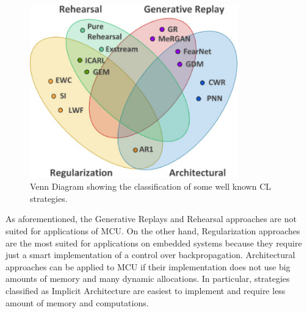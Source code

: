 \documentclass[12pt]{report}
\begin{document}
\begin{figure}[h!]
    \centering
    \includegraphics[width=90mm]{Figures/Chapter1/CL_algorithms.jpg} 
    \caption{Venn Diagram showing the classification of some well known CL strategies.}
    \label{fig:CLstrategies}    
\end{figure}  

As aforementioned, the Generative Replays and Rehearsal approaches are not suited for applications of MCU. On the other hand, Regularization approaches are the most suited for applications on embedded systems because they require just a smart implementation of a control over backpropagation. Architectural approaches can be applied to MCU if their implementation does not use big amounts of memory and many dynamic allocations. In particular, strategies classified as Implicit Architecture are easiest to implement and require less amount of memory and computations.\\
\end{document}
